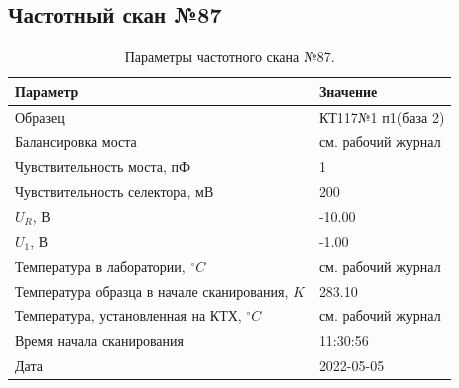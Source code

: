 \subsection{Частотный скан №87}
\begin{table}[!ht]
    \centering
    \caption{Параметры частотного скана №87.}
    \begin{tabular}{|l|l|}
        \hline
        Параметр                                       & Значение                  \\ \hline
        Образец                                        & КТ117№1 п1(база 2)        \\ \hline
        Балансировка моста                             & см. рабочий журнал        \\ \hline
        Чувствительность моста, пФ                     & 1                         \\ \hline
        Чувствительность селектора, мВ                 & 200                       \\ \hline
        $U_R$, В                                       & -10.00                    \\ \hline
        $U_1$, В                                       & -1.00                     \\ \hline
        Температура в лаборатории, $^\circ C$          & см. рабочий журнал        \\ \hline
        Температура образца в начале сканирования, $K$ & 283.10                    \\ \hline
        Температура, установленная на КТХ, $^\circ C$  & см. рабочий журнал        \\ \hline
        Время начала сканирования                      & 11:30:56                  \\ \hline
        Дата                                           & 2022-05-05                \\ \hline
    \end{tabular}
    \label{table:frequency_scan_87}
\end{table}

